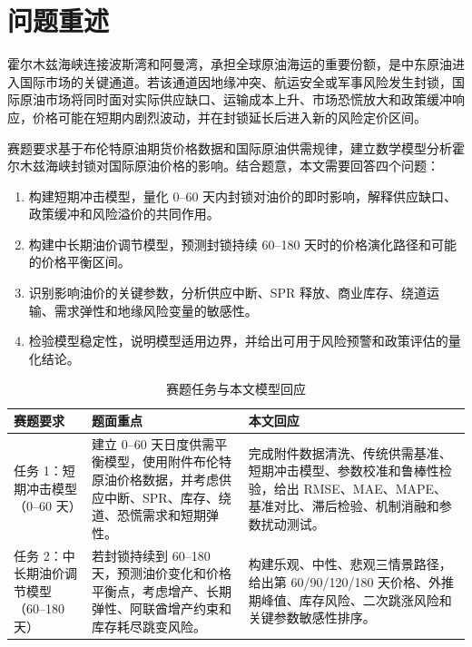 \section{问题重述}

霍尔木兹海峡连接波斯湾和阿曼湾，承担全球原油海运的重要份额，是中东原油进入国际市场的关键通道。若该通道因地缘冲突、航运安全或军事风险发生封锁，国际原油市场将同时面对实际供应缺口、运输成本上升、市场恐慌放大和政策缓冲响应，价格可能在短期内剧烈波动，并在封锁延长后进入新的风险定价区间。

赛题要求基于布伦特原油期货价格数据和国际原油供需规律，建立数学模型分析霍尔木兹海峡封锁对国际原油价格的影响。结合题意，本文需要回答四个问题：

\begin{enumerate}
  \item 构建短期冲击模型，量化 0--60 天内封锁对油价的即时影响，解释供应缺口、政策缓冲和风险溢价的共同作用。
  \item 构建中长期油价调节模型，预测封锁持续 60--180 天时的价格演化路径和可能的价格平衡区间。
  \item 识别影响油价的关键参数，分析供应中断、SPR 释放、商业库存、绕道运输、需求弹性和地缘风险变量的敏感性。
  \item 检验模型稳定性，说明模型适用边界，并给出可用于风险预警和政策评估的量化结论。
\end{enumerate}

\begin{table}[!htbp]
\centering
\caption{赛题任务与本文模型回应}
\begin{tabularx}{\linewidth}{lX X}
\toprule
赛题要求 & 题面重点 & 本文回应 \\
\midrule
任务 1：短期冲击模型（0--60 天） & 建立 0--60 天日度供需平衡模型，使用附件布伦特原油价格数据，并考虑供应中断、SPR、库存、绕道、恐慌需求和短期弹性。 & 完成附件数据清洗、传统供需基准、短期冲击模型、参数校准和鲁棒性检验，给出 RMSE、MAE、MAPE、基准对比、滞后检验、机制消融和参数扰动测试。 \\
任务 2：中长期油价调节模型（60--180 天） & 若封锁持续到 60--180 天，预测油价变化和价格平衡点，考虑增产、长期弹性、阿联酋增产约束和库存耗尽跳变风险。 & 构建乐观、中性、悲观三情景路径，给出第 60/90/120/180 天价格、外推期峰值、库存风险、二次跳涨风险和关键参数敏感性排序。 \\
\bottomrule
\end{tabularx}
\end{table}
